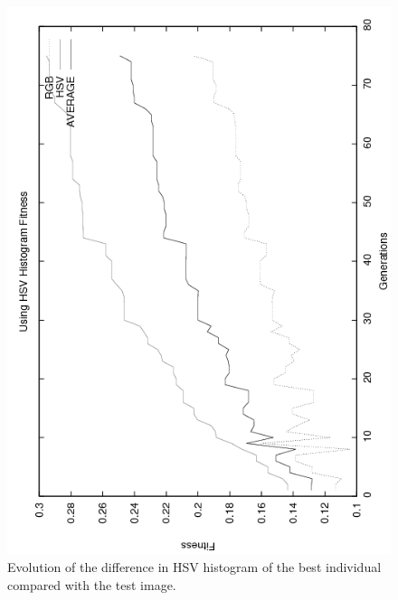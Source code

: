 \begin{figure}
   \includegraphics[angle=-90,scale =0.40] {gfx/art/hsvgens.png}
\caption{Evolution of the difference in HSV histogram of the best individual compared with the test image. }
\label{fig:hsvgens}
\end{figure}

